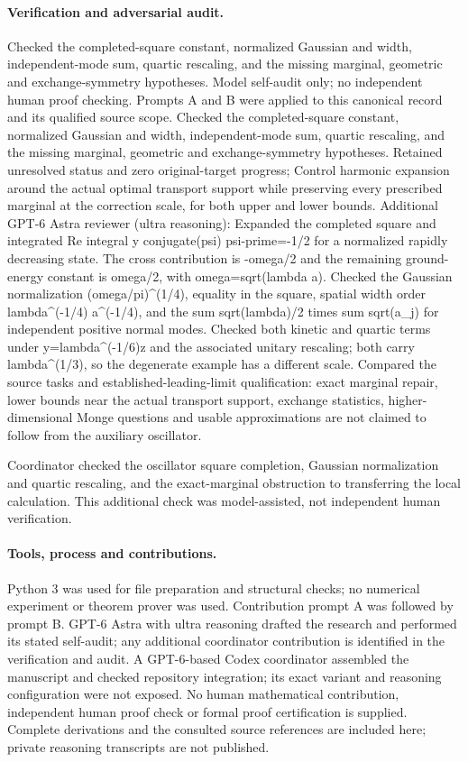 \documentclass[11pt]{article}
\begin{document}
\paragraph{Verification and adversarial audit.}
Checked the completed-square constant, normalized Gaussian and width, independent-mode sum, quartic rescaling, and the missing marginal, geometric and exchange-symmetry hypotheses. Model self-audit only; no independent human proof checking. Prompts A and B were applied to this canonical record and its qualified source scope. Checked the completed-square constant, normalized Gaussian and width, independent-mode sum, quartic rescaling, and the missing marginal, geometric and exchange-symmetry hypotheses. Retained unresolved status and zero original-target progress; Control harmonic expansion around the actual optimal transport support while preserving every prescribed marginal at the correction scale, for both upper and lower bounds. Additional GPT-6 Astra reviewer (ultra reasoning): Expanded the completed square and integrated Re integral y conjugate(psi) psi-prime=-1/2 for a normalized rapidly decreasing state. The cross contribution is -omega/2 and the remaining ground-energy constant is omega/2, with omega=sqrt(lambda a). Checked the Gaussian normalization (omega/pi)\textasciicircum{}(1/4), equality in the square, spatial width order lambda\textasciicircum{}(-1/4) a\textasciicircum{}(-1/4), and the sum sqrt(lambda)/2 times sum sqrt(a\_j) for independent positive normal modes. Checked both kinetic and quartic terms under y=lambda\textasciicircum{}(-1/6)z and the associated unitary rescaling; both carry lambda\textasciicircum{}(1/3), so the degenerate example has a different scale. Compared the source tasks and established-leading-limit qualification: exact marginal repair, lower bounds near the actual transport support, exchange statistics, higher-dimensional Monge questions and usable approximations are not claimed to follow from the auxiliary oscillator.

Coordinator checked the oscillator square completion, Gaussian normalization and quartic rescaling, and the exact-marginal obstruction to transferring the local calculation. This additional check was model-assisted, not independent human verification.

\paragraph{Tools, process and contributions.}
Python 3 was used for file preparation and structural checks; no numerical experiment or theorem prover was used. Contribution prompt A was followed by prompt B. GPT-6 Astra with ultra reasoning drafted the research and performed its stated self-audit; any additional coordinator contribution is identified in the verification and audit. A GPT-6-based Codex coordinator assembled the manuscript and checked repository integration; its exact variant and reasoning configuration were not exposed. No human mathematical contribution, independent human proof check or formal proof certification is supplied. Complete derivations and the consulted source references are included here; private reasoning transcripts are not published.
\end{document}

